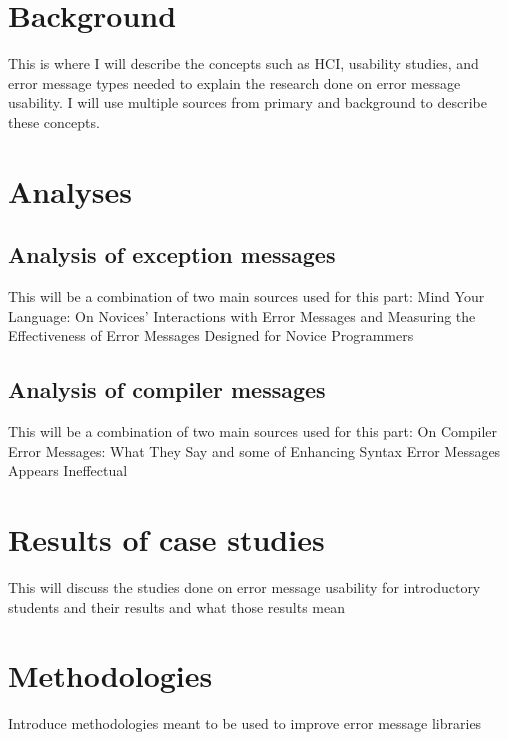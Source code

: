 \documentclass{sig-alternate}
\begin{document}
\section{Background}\label{background}
This is where I will describe the concepts such as HCI, usability studies, and error message types needed to explain the research done on error message usability. I will use multiple sources from primary and background to describe these concepts. 



\section{Analyses}\label{analyses}



\subsection{Analysis of exception messages}
This will be a combination of two main sources used for this part: Mind Your Language: On Novices’ Interactions with Error Messages and Measuring the Effectiveness of Error Messages Designed for Novice Programmers

\subsection{Analysis of compiler messages}
This will be a combination of two main sources used for this part: On Compiler Error Messages: What They Say and some of Enhancing Syntax Error Messages Appears Ineffectual


\section{Results of case studies}\label{results}
This will discuss the studies done on error message usability for introductory students and their results and what those results mean



\section{Methodologies}
Introduce methodologies meant to be used to improve error message libraries

\end{document}
